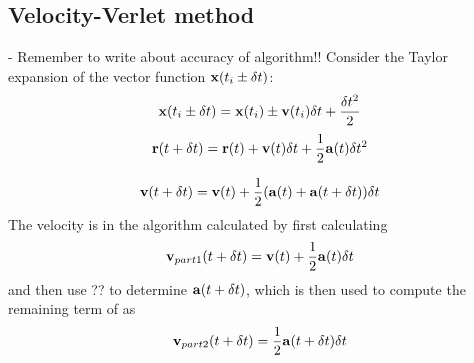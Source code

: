 \subsection{Velocity-Verlet method}
\label{sec:methodVV}
- Remember to write about accuracy of algorithm!!
Consider the Taylor expansion of the vector function $\mbox{\textbf{x}}(t_i \pm \delta t)$:
\begin{align}
	\mbox{\textbf{x}}(t_i \pm \delta t) = \mbox{\textbf{x}}(t_i) \pm \mbox{\textbf{v}} (t_i) \delta t
	+ \frac{\delta t ^2}{2}
\end{align}
\begin{align}
	\mbox{\textbf{r}}(t+\delta t) = \mbox{\textbf{r}}(t) + \mbox{\textbf{v}} (t) \delta t + \frac{1}{2} \mbox{\textbf{a}} (t) \delta t^2 
	\label{eq:VVmethodNextPosition}
\end{align}

\begin{align}
	\mbox{\textbf{v}} (t + \delta t) = \mbox{\textbf{v}} (t) + \frac{1}{2} ( \mbox{\textbf{a}} (t) + \mbox{\textbf{a}} (t + \delta t) ) \delta t
	\label{eq:VVmethodNextVelocity}
\end{align}
The velocity is in the algorithm calculated  by first calculating 
\begin{align}
	\mbox{\textbf{v}}_{part1} (t + \delta t) = \mbox{\textbf{v}} (t) + \frac{1}{2}  \mbox{\textbf{a}} (t)  \delta t
	\label{eq:VVmethodNextVelocityPart1}
\end{align}
and then use ??  to determine $\mbox{\textbf{a}} (t + \delta t)$, which is then used to compute the remaining term of  as 
\begin{align}
	\mbox{\textbf{v}}_{part2} (t + \delta t) = \frac{1}{2} \mbox{\textbf{a}} (t + \delta t) \delta t
	\label{eq:VVmethodNextVelocityPart2}
\end{align}